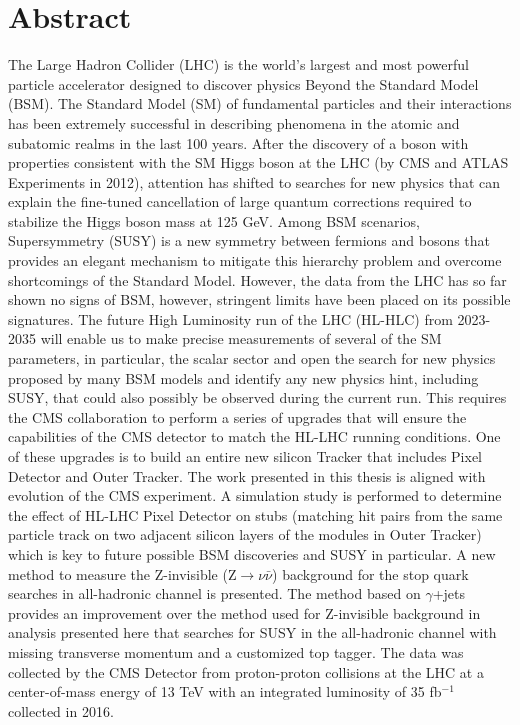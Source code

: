 \documentclass[12pt,twoside,openany]{book}
\begin{document}


\frontmatter
\chapter*{Abstract}
The Large Hadron Collider (LHC) is the world's largest and most powerful particle accelerator designed to discover physics Beyond the Standard Model (BSM). The Standard Model (SM) of fundamental particles and their interactions has been extremely successful in describing phenomena in the atomic and subatomic realms in the last 100 years. After the discovery of a boson with properties consistent with the SM Higgs boson at the LHC (by CMS and ATLAS Experiments in 2012), attention has shifted to searches for new physics that can explain the fine-tuned cancellation of large quantum corrections required to stabilize the Higgs boson mass at 125 GeV. Among BSM scenarios, Supersymmetry (SUSY) is a new symmetry between fermions and bosons that provides an elegant mechanism to mitigate this hierarchy problem and overcome shortcomings of the Standard Model. However, the data from the LHC has so far shown no signs of BSM, however, stringent limits have been placed on its possible signatures. The future High Luminosity run of the LHC (HL-HLC) from 2023-2035 will enable us to make precise measurements of several of the SM parameters, in particular, the scalar sector and open the search for new physics proposed by many BSM models and identify any new physics hint, including SUSY, that could also possibly be observed during the current run. This requires the CMS collaboration to perform a series of upgrades that will ensure the capabilities of the CMS detector to match the HL-LHC running conditions. One of these upgrades is to build an entire new silicon Tracker that includes Pixel Detector and Outer Tracker. The work presented in this thesis is aligned with evolution of the CMS experiment. A simulation study is performed to determine the effect of HL-LHC Pixel Detector on stubs (matching hit pairs from the same particle track on two adjacent silicon layers of the modules in Outer Tracker) which is key to future possible BSM discoveries and SUSY in particular. A new method to measure the Z-invisible (Z$\rightarrow \nu\bar{\nu}$) background for the stop quark searches in all-hadronic channel is presented. The method based on $\gamma$+jets provides an improvement over the method used for Z-invisible background in analysis presented here that searches for SUSY in the all-hadronic channel with missing transverse momentum and a customized top tagger. The data was collected by the CMS Detector from proton-proton collisions at the LHC at a center-of-mass energy of 13 TeV with an integrated luminosity of 35 fb$^{-1}$ collected in 2016.
\end{document}
